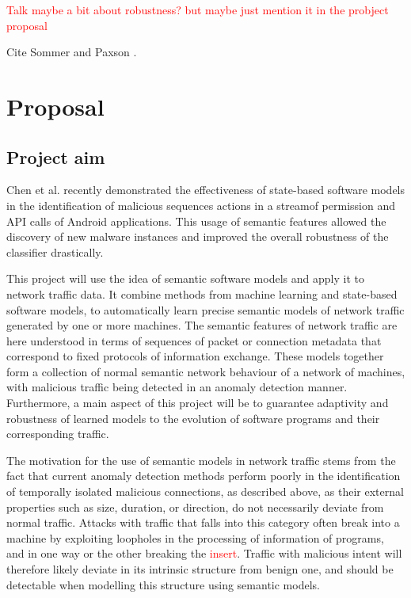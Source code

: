 \documentclass[a4paper,12pt,twoside]{report}
\begin{document}
\textcolor{red}{Talk maybe a bit about robustness? but maybe just mention it in the probject proposal}


Cite Sommer and Paxson \cite{sommer_outside_2010}.

\chapter{Proposal}

\section{Project aim}

Chen et al. \cite{chen_2016_robust,chen_more_2016} recently demonstrated the effectiveness of state-based software models in the identification of malicious sequences actions in a streamof permission and API calls of Android applications. This usage of semantic features allowed the discovery of new malware instances and improved the overall robustness of the classifier drastically. 

This project will use the idea of semantic software models and apply it to network traffic data. It combine methods from machine learning and state-based software models, to automatically learn precise semantic models of network traffic generated by one or more machines. The semantic features of network traffic are here understood in terms of sequences of packet or connection metadata that correspond to fixed protocols of information exchange. These models together form a collection of normal semantic network behaviour of a network of machines, with malicious traffic being detected in an anomaly detection manner. Furthermore, a main aspect of this project will be to guarantee adaptivity and robustness of learned models to the evolution of software programs and their corresponding traffic. 

The motivation for the use of semantic models in network traffic stems from the fact that current anomaly detection methods perform poorly in the identification of temporally isolated malicious connections, as described above, as their external properties such as size, duration, or direction, do not necessarily deviate from normal traffic. Attacks with traffic that falls into this category often break into a machine by exploiting loopholes in the processing of information of programs, and in one way or the other breaking the \textcolor{red}{insert}. Traffic with malicious intent will therefore likely deviate in its intrinsic structure from benign one, and should be detectable when modelling this structure using semantic models.
\end{document}
